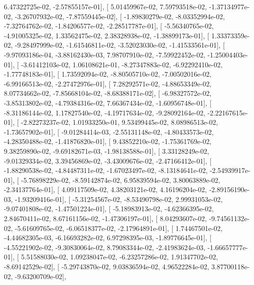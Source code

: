 \documentclass{article}
\begin{document}
          6.47322725e-02,  -2.57855157e-01],
       [  5.01459967e-02,   7.59793518e-02,  -1.37134977e-02,
         -3.26707932e-02,  -7.87559445e-02],
       [ -1.89830279e-02,  -8.03352994e-02,  -7.32764762e-02,
         -1.84206577e-02,  -2.28517787e-01],
       [ -5.56340765e-02,  -4.91005325e-02,   1.33562475e-02,
          2.38328938e-02,  -1.38899173e-01],
       [  1.33373359e-02,  -9.28497999e-02,  -1.61546811e-02,
         -3.52023030e-02,  -1.41533561e-01],
       [ -9.97093186e-04,  -3.88162430e-03,   7.98707910e-02,
         -7.59922452e-02,  -1.25004403e-01],
       [ -3.61412103e-02,   1.06108621e-01,  -8.27347883e-02,
         -6.92292410e-02,  -1.77748183e-01],
       [  1.73592094e-02,  -8.80505710e-02,  -7.00502016e-02,
         -6.99166513e-02,  -2.27472976e-01],
       [  7.28292571e-02,  -4.88653349e-02,   8.07734662e-02,
         -7.85668104e-02,  -8.68388171e-02],
       [ -6.98327572e-02,  -3.85313802e-02,  -4.79384316e-02,
          7.66367434e-02,  -1.60956748e-01],
       [ -8.31186144e-02,   1.17827540e-02,  -4.19717634e-02,
         -9.28092164e-02,  -2.22167615e-01],
       [ -2.82273237e-02,   1.01933250e-01,   9.53499445e-02,
          8.08986513e-02,  -1.73657902e-01],
       [ -9.01284414e-03,  -2.55131148e-02,  -4.80433573e-02,
         -4.28350488e-02,  -1.41876820e-01],
       [  9.43852210e-02,  -1.75361769e-02,   9.38259890e-02,
         -9.69182671e-03,  -1.98138588e-01],
       [  3.33128249e-02,  -9.01329334e-02,   3.39456869e-02,
         -3.43009676e-02,  -2.47166412e-01],
       [ -1.88290538e-02,  -4.84487311e-02,  -1.67023497e-02,
         -8.13184641e-02,  -2.54939917e-01],
       [ -5.76898229e-02,  -8.59142874e-02,   6.95839594e-02,
          3.80063889e-02,  -2.34137764e-01],
       [  4.09117509e-02,   4.38203121e-02,   4.16196204e-02,
         -2.89156190e-03,  -1.93209416e-01],
       [ -5.31254567e-02,  -8.53490798e-02,   2.99931053e-02,
         -9.07401808e-02,  -1.47501224e-01],
       [ -5.18983913e-02,  -4.62366395e-02,   2.84670411e-02,
          8.67161156e-02,  -1.47306197e-01],
       [  8.04293607e-02,  -9.74561132e-02,  -5.61609765e-02,
         -6.06518377e-02,  -2.17964891e-01],
       [  1.74467501e-02,  -4.44682305e-03,  -6.16693282e-02,
          6.97298395e-03,  -1.89776645e-01],
       [ -4.55221902e-02,  -9.30830064e-02,   8.79083344e-02,
         -2.41983624e-03,  -1.66657777e-01],
       [  5.51588030e-02,   1.09238047e-02,  -6.23257286e-02,
          1.91347702e-02,  -8.69142529e-02],
       [ -5.29743870e-02,   9.03836594e-02,   4.96522284e-02,
          3.87700118e-02,  -9.63200709e-02],
\end{document}
